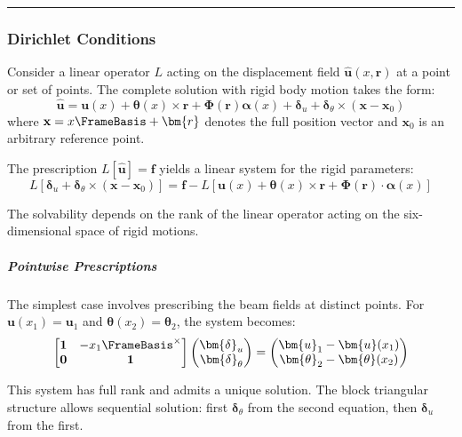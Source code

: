 
\medskip
\hrule 

\subsubsection{Dirichlet Conditions}

Consider a linear operator $L$ acting on the displacement field $\hat{\bm{u}}(x,\bm{r})$ at a point or set of points. The complete solution with rigid body motion takes the form:
\begin{equation}
\hat{\bm{u}} = \bm{u}(x) + \bm{\theta}(x) \times \bm{r} + \bm{\Phi}(\bm{r}) \bm{\alpha}(x) + \bm{\delta}_u + \bm{\delta}_\theta \times (\mathbf{x} - \mathbf{x}_0)
\end{equation}
where $\mathbf{x} = x\FrameBasis + \bm{r}$ denotes the full position vector and $\mathbf{x}_0$ is an arbitrary reference point.

The prescription $L[\hat{\bm{u}}] = \mathbf{f}$ yields a linear system for the rigid parameters:
\begin{equation}
L[\bm{\delta}_u + \bm{\delta}_\theta \times (\mathbf{x} - \mathbf{x}_0)] = \mathbf{f} - L[\bm{u}(x) + \bm{\theta}(x) \times \bm{r} + \bm{\Phi}(\bm{r}) \cdot \bm{\alpha}(x)]
\end{equation}

The solvability depends on the rank of the linear operator acting on the six-dimensional space of rigid motions.

\subparagraph{Pointwise Prescriptions}

The simplest case involves prescribing the beam fields at distinct points. For $\bm{u}(x_1) = \bm{u}_1$ and $\bm{\theta}(x_2) = \bm{\theta}_2$, the system becomes:
\begin{equation}
\begin{bmatrix}
\mathbf{1} & -x_1\FrameBasis^{\times} \\
\mathbf{0} & \mathbf{1}
\end{bmatrix}
\begin{pmatrix}
\bm{\delta}_u \\
\bm{\delta}_\theta
\end{pmatrix} = 
\begin{pmatrix}
\bm{u}_1 - \bm{u}(x_1) \\
\bm{\theta}_2 - \bm{\theta}(x_2)
\end{pmatrix}
\end{equation}

This system has full rank and admits a unique solution. The block triangular structure allows sequential solution: first $\bm{\delta}_\theta$ from the second equation, then $\bm{\delta}_u$ from the first. 


